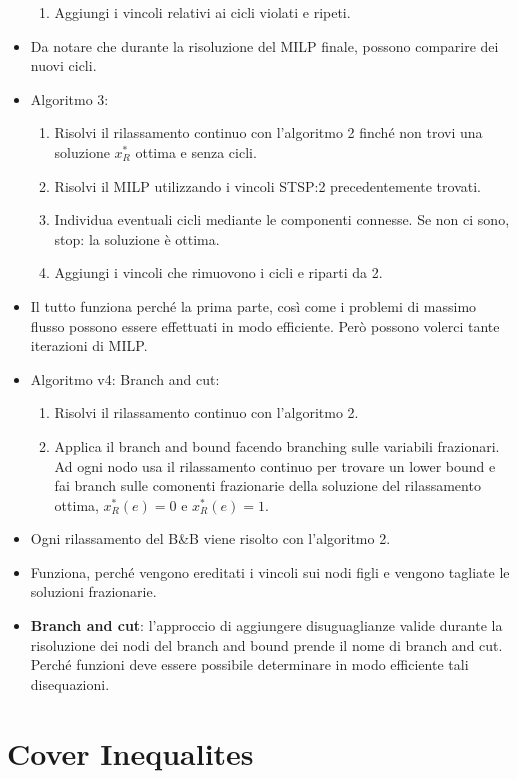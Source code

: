 \begin{itemize}
\begin{enumerate}
		\item Aggiungi i vincoli relativi ai cicli violati e ripeti.
	\end{enumerate}
	\item Da notare che durante la risoluzione del MILP finale, possono comparire dei nuovi cicli.
	\item Algoritmo 3:
	\begin{enumerate}
		\item Risolvi il rilassamento continuo con l'algoritmo 2 finché non trovi una soluzione $x_{R}^*$ ottima e senza cicli.
		\item Risolvi il MILP utilizzando i vincoli STSP:2 precedentemente trovati.
		\item Individua eventuali cicli mediante le componenti connesse. Se non ci sono, stop: la soluzione è ottima.
		\item Aggiungi i vincoli che rimuovono i cicli e riparti da 2.
	\end{enumerate}
	\item Il tutto funziona perché la prima parte, così come i problemi di massimo flusso possono essere effettuati in modo efficiente. Però possono volerci tante iterazioni di MILP.
	\item Algoritmo v4: Branch and cut:
	\begin{enumerate}
		\item Risolvi il rilassamento continuo con l'algoritmo 2.
		\item Applica il branch and bound facendo branching sulle variabili frazionari. Ad ogni nodo usa il rilassamento continuo per trovare un lower bound e fai branch sulle comonenti frazionarie della soluzione del rilassamento ottima, $x_{R}^*(e) = 0$ e $x_{R}^*(e) = 1$.
	\end{enumerate}
	\item Ogni rilassamento del B\&B viene risolto con l'algoritmo 2.
	\item Funziona, perché vengono ereditati i vincoli sui nodi figli e vengono tagliate le soluzioni frazionarie.
	\item \textbf{Branch and cut}: l'approccio di aggiungere disuguaglianze valide durante la risoluzione dei nodi del branch and bound prende il nome di branch and cut. Perché funzioni deve essere possibile determinare in modo efficiente tali disequazioni.
\end{itemize}

\section{Cover Inequalites}


